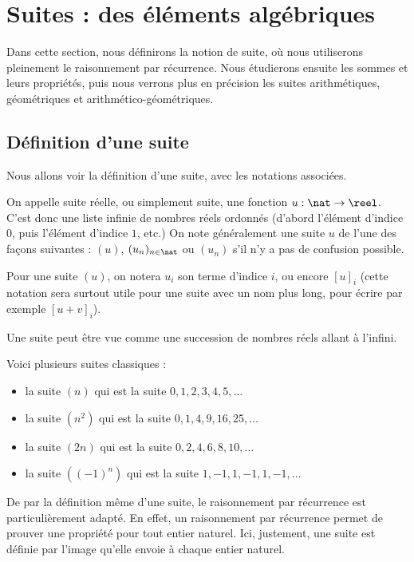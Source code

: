 \section{Suites : des éléments algébriques}

Dans cette section, nous définirons la notion de suite, où nous utiliserons pleinement le raisonnement par récurrence. Nous étudierons ensuite les sommes et leurs propriétés, puis nous verrons plus en précision les suites arithmétiques, géométriques et arithmético-géométriques.

\subsection{Définition d'une suite}

Nous allons voir la définition d'une suite, avec les notations associées.

\begin{defi}
    On appelle suite réelle, ou simplement suite, une fonction $u : \nat \to \reel$. C'est donc une liste infinie de nombres réels ordonnés (d'abord l'élément d'indice $0$, puis l'élément d'indice $1$, etc.) On note généralement une suite $u$ de l'une des façons suivantes : $(u)$, $(u_n)_{n\in\nat}$ ou $(u_n)$ s'il n'y a pas de confusion possible.
    
    Pour une suite $(u)$, on notera $u_i$ son terme d'indice $i$, ou encore $[u]_i$ (cette notation sera surtout utile pour une suite avec un nom plus long, pour écrire par exemple $[u+v]_i$).
    
    Une suite peut être vue comme une succession de nombres réels allant à l'infini.
\end{defi}

\begin{expl}
    Voici plusieurs suites classiques :
    \begin{itemize}[label=$\bullet$]
        \item la suite $(n)$ qui est la suite $0,1,2,3,4,5,\ldots$
        \item la suite $(n^2)$ qui est la suite $0,1,4,9,16,25,\ldots$
        \item la suite $(2n)$ qui est la suite $0,2,4,6,8,10,\ldots$
        \item la suite $((-1)^n)$ qui est la suite $1,-1,1,-1,1,-1,\ldots$
    \end{itemize}
\end{expl}

\begin{rmk}
    De par la définition même d'une suite, le raisonnement par récurrence est particulièrement adapté. En effet, un raisonnement par récurrence permet de prouver une propriété pour tout entier naturel. Ici, justement, une suite est définie par l'image qu'elle envoie à chaque entier naturel.
\end{rmk}

